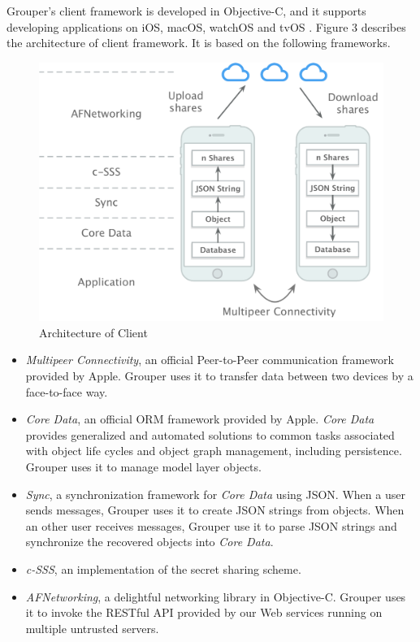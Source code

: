 \documentclass[twocolumn,10pt]{article}
\begin{document}
Grouper's client framework is developed in Objective-C, and it supports developing applications on iOS, macOS, watchOS and tvOS . 
Figure 3 describes the architecture of client framework. It is based on the following frameworks.   

\begin{figure}[t]
	\centering
	\includegraphics[scale=0.35]{architecture}
	\caption{Architecture of Client}
\end{figure}

\begin{itemize}
	\setlength{\itemsep}{1pt}
	\setlength{\parskip}{0pt}
	\setlength{\parsep}{0pt}
	\item 
	\emph{Multipeer Connectivity}\cite{mc},  an official Peer-to-Peer communication framework provided by Apple. 
	Grouper uses it to transfer data between two devices by a face-to-face way.
	\item 
	\emph{Core Data}\cite{coredata}, an official ORM framework provided by Apple.
	\emph{Core Data} provides generalized and automated solutions to common tasks associated with object life cycles and object graph management, including persistence. 
	Grouper uses it to manage model layer objects. 
	\item 
	\emph{Sync}\cite{sync}, a synchronization framework for \emph{Core Data} using JSON. 
	When a user sends messages, Grouper uses it to create JSON strings from objects. 
	When an other user receives messages, Grouper use it to parse JSON strings and synchronize the recovered objects into \emph{Core Data}.
	\item 
	\emph{c-SSS}\cite{c-sss}, an implementation of the secret sharing scheme.
	\item 
	\emph{AFNetworking}\cite{afnetworking}, a delightful networking library in Objective-C. 
	Grouper uses it to invoke the RESTful API provided by our Web services running on multiple untrusted servers. 
\end{itemize}
\end{document}
